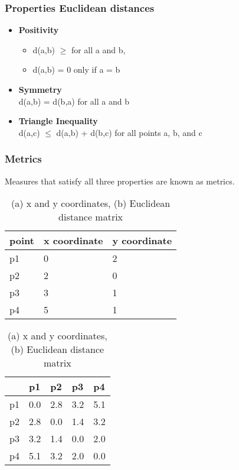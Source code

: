 \begin{frame}[fragile]\frametitle{Properties Euclidean distances}

		\begin{itemize}
			\item {\bf Positivity}
			\begin{itemize}
				\item d(a,b) $\geq$ for all a and b,
				\item d(a,b) = 0 only if a = b
			\end{itemize}
			\item {\bf Symmetry} \\
				d(a,b) = d(b,a) for all a and b
			\item {\bf Triangle Inequality} \\
				d(a,c) $\leq$ d(a,b) + d(b,c) for all points a, b, and c
\end{itemize}
\end{frame}


\begin{frame}[fragile]\frametitle{Metrics}

	Measures that satisfy all three properties are known as metrics.

	\begin{table}[!h]
		\centering
		\begin{tabular}{| l | l | l |}
			\hline
			point & x coordinate & y coordinate \\ \hline
			p1 & 0 & 2 \\ \hline
			p2 & 2 & 0 \\ \hline
			p3 & 3 & 1 \\ \hline
			p4 & 5 & 1 \\ \hline
		\end{tabular}
		\begin{tabular}{| l | l | l | l | l |}
			\hline
			 & p1 & p2 & p3 & p4 \\ \hline
			p1 & 0.0 & 2.8 & 3.2 & 5.1 \\ \hline
			p2 & 2.8 & 0.0 & 1.4 & 3.2 \\ \hline
			p3 & 3.2 & 1.4 & 0.0 & 2.0 \\ \hline
			p4 & 5.1 & 3.2 & 2.0 & 0.0 \\ \hline
		\end{tabular}
		\caption{(a) x and y coordinates, (b) Euclidean distance matrix}
\end{table}
\end{frame}


